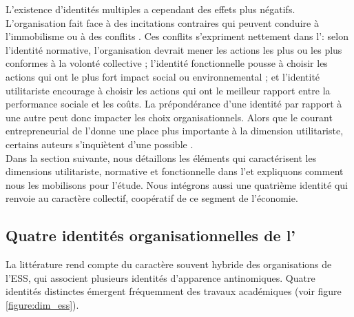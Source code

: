         L'existence d'identités multiples a cependant des effets plus négatifs. L'organisation fait face à des incitations contraires qui peuvent conduire à l'immobilisme ou à des conflits \parencite{pratt2000classifying}. Ces conflits s'expriment nettement dans l'\ess : selon l'identité normative, l'organisation devrait mener les actions les plus  ou les plus conformes à la volonté collective ; l'identité fonctionnelle pousse à choisir les actions qui ont le plus fort impact social ou environnemental ; et l'identité utilitariste encourage à choisir les actions qui ont le meilleur rapport entre la performance sociale et les coûts. La prépondérance d'une identité par rapport à une autre peut donc impacter les choix organisationnels. Alors que le courant entrepreneurial de l'\ess donne une place plus importante à la dimension utilitariste, certains auteurs s'inquiètent d'une possible  \parencite[par exemple][]{ramus2017stakeholders, dart2004being, mair2012organizing}. \\

        Dans la section suivante, nous détaillons les éléments qui caractérisent les dimensions utilitariste, normative et fonctionnelle dans l'\ess et expliquons comment nous les mobilisons pour l'étude. Nous intégrons aussi une quatrième identité qui renvoie au caractère collectif, coopératif de ce segment de l'économie.

    \subsection{Quatre identités organisationnelles de l'\ess}

        La littérature rend compte du caractère souvent hybride des organisations de l'ESS, qui associent plusieurs identités d'apparence antinomiques. Quatre identités distinctes émergent fréquemment des travaux académiques (voir figure \ref{figure:dim_ess}). \\

